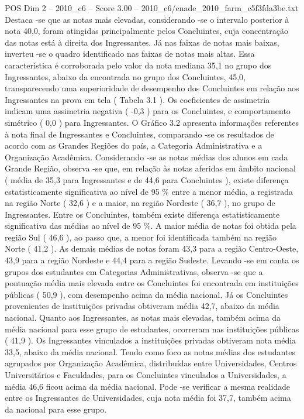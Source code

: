 \begin{textsample}{POS Dim 2 – 2010\_c6 – Score 3.00 – 2010\_c6/enade\_2010\_farm\_c5f3fda3be.txt}
Destaca -se que as notas mais elevadas, considerando -se o intervalo posterior à nota 40,0, foram atingidas principalmente pelos Concluintes, cuja concentração das notas está à direita dos Ingressantes.
Já nas faixas de notas mais baixas, inverteu -se o quadro identificado nas faixas de notas mais altas.
Essa característica é corroborada pelo valor da nota mediana 35,1 no grupo dos Ingressantes, abaixo da encontrada no grupo dos Concluintes, 45,0, transparecendo uma superioridade de desempenho dos Concluintes em relação aos Ingressantes na prova em tela ( Tabela 3.1 ).
Os coeficientes de assimetria indicam uma assimetria negativa ( -0,3 ) para os Concluintes, e comportamento simétrico ( 0,0 ) para Ingressantes.
O Gráfico 3.2 apresenta informações referentes à nota final de Ingressantes e Concluintes, comparando -se os resultados de acordo com as Grandes Regiões do país, a Categoria Administrativa e a Organização Acadêmica.
Considerando -se as notas médias dos alunos em cada Grande Região, observa -se que, em relação às notas aferidas em âmbito nacional ( média de 35,3 para Ingressantes e de 44,6 para Concluintes ), existe diferença estatisticamente significativa ao nível de 95 \% entre a menor média, a registrada na região Norte ( 32,6 ) e a maior, na região Nordeste ( 36,7 ), no grupo de Ingressantes.
Entre os Concluintes, também existe diferença estatisticamente significativa das médias ao nível de 95 \%.
A maior média de notas foi obtida pela região Sul ( 46,6 ), ao passo que, a menor foi identificada também na região Norte ( 41,2 ).
As demais médias de notas foram 43,3 para a região Centro-Oeste, 43,9 para a região Nordeste e 44,4 para a região Sudeste.
Levando -se em conta os grupos dos estudantes em Categorias Administrativas, observa -se que a pontuação média mais elevada entre os Concluintes foi encontrada em instituições públicas ( 50,9 ), com desempenho acima da média nacional.
Já os Concluintes provenientes de instituições privadas obtiveram média 42,7, abaixo da média nacional.
Quanto aos Ingressantes, as notas mais elevadas, também acima da média nacional para esse grupo de estudantes, ocorreram nas instituições públicas ( 41,9 ).
Os Ingressantes vinculados a instituições privadas obtiveram nota média 33,5, abaixo da média nacional.
Tendo como foco as notas médias dos estudantes agrupados por Organização Acadêmica, distribuídas entre Universidades, Centros Universitários e Faculdades, para os Concluintes vinculados a Universidades, a média 46,6 ficou acima da média nacional.
Pode -se verificar a mesma realidade entre os Ingressantes de Universidades, cuja nota média foi 37,7, também acima da nacional para esse grupo.

\end{textsample}
